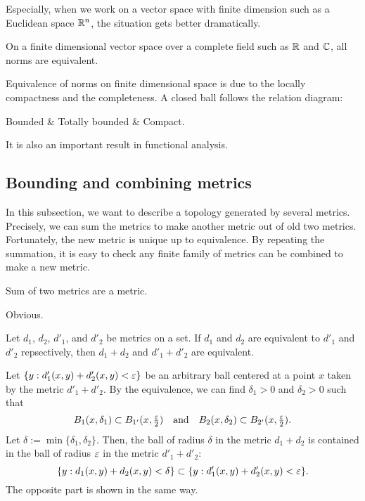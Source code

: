 \documentclass{../crs}
\begin{document}
Especially, when we work on a vector space with finite dimension such as a Euclidean space $\mathbb{R}^n$, the situation gets better dramatically.

\begin{thm}
On a finite dimensional vector space over a complete field such as $\mathbb{R}$ and $\mathbb{C}$, all norms are equivalent.
\end{thm}
\begin{pf}
\end{pf}

\begin{rmk}
Equivalence of norms on finite dimensional space is due to the locally compactness and the completeness.
A closed ball follows the relation diagram:
\begin{rd}[column sep=huge]
Bounded  & Totally bounded  & Compact.
\end{rd}
It is also an important result in functional analysis.
\end{rmk}




\subsection{Bounding and combining metrics}

In this subsection, we want to describe a topology generated by several metrics.
Precisely, we can sum the metrics to make another metric out of old two metrics.
Fortunately, the new metric is unique up to equivalence.
By repeating the summation, it is easy to check any finite family of metrics can be combined to make a new metric.

\begin{prop}
Sum of two metrics are a metric.
\end{prop}
\begin{pf}
Obvious.
\end{pf}
\begin{prop}
Let $d_1$, $d_2$, $d'_1$, and $d'_2$ be metrics on a set.
If $d_1$ and $d_2$ are equivalent to $d'_1$ and $d'_2$ repsectively, then $d_1+d_2$ and $d'_1+d'_2$ are equivalent.
\end{prop}
\begin{pf}
Let $\{y:d'_1(x,y)+d'_2(x,y)<\varepsilon\}$ be an arbitrary ball centered at a point $x$ taken by the metric $d'_1+d'_2$.
By the equivalence, we can find $\delta_1>0$ and $\delta_2>0$ such that
\[B_1(x,\delta_1)\subset B_{1'}(x,\tfrac{\varepsilon}2)\quad\text{and}\quad B_2(x,\delta_2)\subset B_{2'}(x,\tfrac{\varepsilon}2).\]
Let $\delta:=\min\{\delta_1,\delta_2\}$.
Then, the ball of radius $\delta$ in the metric $d_1+d_2$ is contained in the ball of radius $\varepsilon$ in the metric $d'_1+d'_2$:
\[\{y:d_1(x,y)+d_2(x,y)<\delta\}\subset\{y:d'_1(x,y)+d'_2(x,y)<\varepsilon\}.\]
The opposite part is shown in the same way.
\end{pf}
\end{document}
